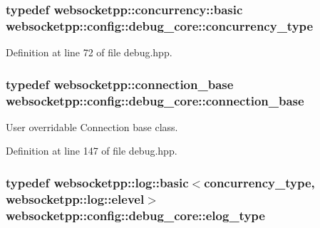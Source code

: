 \hypertarget{structwebsocketpp_1_1config_1_1debug__core_aada73b9183fc032c25178870dbb4d83d}{}
\subsubsection[{concurrency\+\_\+type}]{\setlength{\rightskip}{0pt plus 5cm}typedef {\bf websocketpp\+::concurrency\+::basic} {\bf websocketpp\+::config\+::debug\+\_\+core\+::concurrency\+\_\+type}}\label{structwebsocketpp_1_1config_1_1debug__core_aada73b9183fc032c25178870dbb4d83d}


Definition at line 72 of file debug.\+hpp.

\hypertarget{structwebsocketpp_1_1config_1_1debug__core_a5ff6c6c670417fd86609c8d7a412815d}{}
\subsubsection[{connection\+\_\+base}]{\setlength{\rightskip}{0pt plus 5cm}typedef {\bf websocketpp\+::connection\+\_\+base} {\bf websocketpp\+::config\+::debug\+\_\+core\+::connection\+\_\+base}}\label{structwebsocketpp_1_1config_1_1debug__core_a5ff6c6c670417fd86609c8d7a412815d}


User overridable Connection base class. 



Definition at line 147 of file debug.\+hpp.

\hypertarget{structwebsocketpp_1_1config_1_1debug__core_acfa1ded7f80d6a7276b0ec3fd0859fc3}{}
\subsubsection[{elog\+\_\+type}]{\setlength{\rightskip}{0pt plus 5cm}typedef {\bf websocketpp\+::log\+::basic}$<${\bf concurrency\+\_\+type}, {\bf websocketpp\+::log\+::elevel}$>$ {\bf websocketpp\+::config\+::debug\+\_\+core\+::elog\+\_\+type}}\label{structwebsocketpp_1_1config_1_1debug__core_acfa1ded7f80d6a7276b0ec3fd0859fc3}



